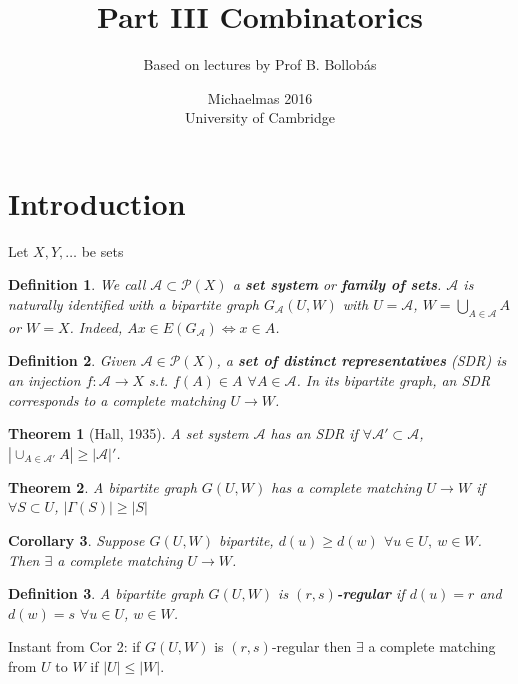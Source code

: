 \documentclass[a4paper]{article}
\title{Part III Combinatorics}
\author{Based on lectures by Prof B. Bollob\'{a}s}
\date{Michaelmas 2016\\University of Cambridge}
\newtheorem*{definition}{Definition}
\newtheorem{theorem}{Theorem}
\newtheorem{corollary}[theorem]{Corollary}
\newcommand*\abs[1]{\left|#1\right|}
\begin{document}
\maketitle
\tableofcontents

\section{Introduction}
Let $X, Y, \dots$ be sets
\begin{definition}
	We call $\mathcal{A}\subset \mathcal{P}(X)$ a \textbf{set system} or \textbf{family of sets}. $\mathcal{A}$ is naturally identified with a bipartite graph $G_\mathcal{A}(U,W)$ with $U=\mathcal{A}$, $W=\bigcup_{A\in\mathcal{A}}A$ or $W=X$. Indeed, $Ax\in E(G_\mathcal{A}) \iff x \in A$.
\end{definition}

\begin{definition}
	Given $\mathcal{A}\in\mathcal{P}(X)$, a \textbf{set of distinct representatives} (SDR) is an injection $f:\mathcal{A}\to X$ s.t. $f(A)\in A$ $\forall A \in \mathcal{A}$. In its bipartite graph, an SDR corresponds to a complete matching $U \to W$.
\end{definition}

\begin{theorem}[Hall, 1935]
	A set system $\mathcal{A}$ has an SDR if $\forall \mathcal{A}'\subset\mathcal{A}$, $\abs{\cup_{A\in\mathcal{A}'}A} \geq \abs{\mathcal{A}}'$.
\end{theorem}
\setcounter{theorem}{0}
\renewcommand{\thetheorem}{\arabic{theorem}'}
\begin{theorem}
	A bipartite graph $G(U,W)$ has a complete matching $U \to W$ if $\forall S \subset U$, $\abs{\Gamma(S)} \geq \abs{S}$
\end{theorem}
\renewcommand{\thetheorem}{\arabic{theorem}}
\begin{corollary}
	Suppose $G(U, W)$ bipartite, $d(u) \geq d(w)$ $\forall u \in U,\ w \in W$. Then $\exists$ a complete matching $U \to W$.
\end{corollary}

\begin{definition}
	A bipartite graph $G(U,W)$ is $(r,s)$\textbf{-regular} if $d(u)=r$ and $d(w)=s$ $\forall u\in U$, $w \in W$.
\end{definition}

Instant from Cor 2: if $G(U,W)$ is $(r,s)$-regular then $\exists$ a complete matching from $U$ to $W$ if $\abs{U} \leq \abs{W}$.
\end{document}

